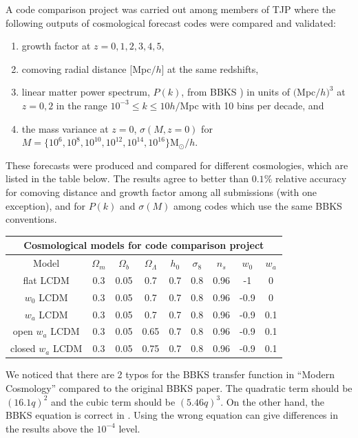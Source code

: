 \documentclass[\docopts]{\docclass}
\begin{document}
A code comparison project was carried out among members of TJP where the following outputs of cosmological forecast codes were compared and validated:
\begin{enumerate}
\item growth factor at $z = 0,1,2,3,4,5$,
\item comoving radial distance $[$Mpc$/h]$ at the same redshifts,
\item linear matter power spectrum, $P(k)$, from BBKS \citealt{BBKS}) in units of $($Mpc$/h)^3$ at $z=0,2$ in the range $10^{-3} \leq k \leq 10 h/$Mpc with 10 bins per decade, and
\item the mass variance at $z=0$, $\sigma(M,z=0)$ for $M =\{10^6, 10^8, 10^{10}, 10^{12}, 10^{14}, 10^{16}\} $M$_\odot/h$.
\end{enumerate}
These forecasts were produced and compared for different cosmologies, which are listed in the table below. The results agree to better than $0.1\%$ relative accuracy for comoving distance and growth factor among all submissions (with one exception), and for $P(k)$ and $\sigma(M)$ among codes which use the same BBKS conventions.

\begin{center}
  \begin{tabular}{ c | c c c c c c c c }
    \hline
    \multicolumn{9}{|c|}{Cosmological models for code comparison project} \\
    \hline
    \hline
    Model & $\Omega_m$ & $\Omega_b$ & $\Omega_\Lambda$ & $h_0$ & $\sigma_8$ & $n_s$ & $w_0$ & $w_a$ \\
    \hline
    flat LCDM & 0.3 & 0.05 & 0.7 & 0.7 & 0.8 & 0.96 & -1 & 0 \\
    $w_0$ LCDM & 0.3 & 0.05 & 0.7 & 0.7 & 0.8 & 0.96 & -0.9 & 0  \\
    $w_a$ LCDM & 0.3 & 0.05 & 0.7 & 0.7 & 0.8 & 0.96 & -0.9 & 0.1  \\
    open $w_a$ LCDM & 0.3 & 0.05 & 0.65 & 0.7 & 0.8 & 0.96 & -0.9 & 0.1  \\
    closed $w_a$ LCDM & 0.3 & 0.05 & 0.75 & 0.7 & 0.8 & 0.96 & -0.9 & 0.1  \\
    \hline
  \end{tabular}
\end{center}

We noticed that there are 2 typos for the BBKS transfer function in ``Modern Cosmology'' \citep{DodelsonBook} compared to the original BBKS paper. The quadratic term should be $(16.1q)^2$ and the cubic term should be $(5.46q)^3$. On the other hand, the BBKS equation is correct in \citet{PeacockBook}. Using the wrong equation can give differences in the results above the $10^{-4}$ level.
\end{document}
